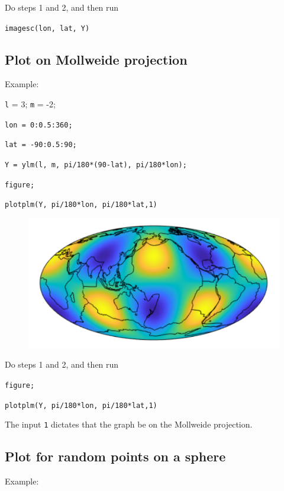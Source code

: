 \documentclass{article}
\begin{document}
\setlength{\parskip}{0.5cm plus4mm minus3mm}

Do steps 1 and 2, and then run

\verb+imagesc(lon, lat, Y)+

\subsection{Plot on Mollweide projection}

Example:
\vspace{2mm}

\setlength{\parskip}{.1mm}

\verb+l+ = 3; \verb+m+ = -2;

\verb+lon = 0:0.5:360;+

\verb+lat = -90:0.5:90;+

\verb+Y = ylm(l, m, pi/180*(90-lat), pi/180*lon);+

\verb+figure;+

\verb+plotplm(Y, pi/180*lon, pi/180*lat,1)+

\begin{figure}[H]
\includegraphics[scale=.8]{mollweide}
\end{figure}

\setlength{\parskip}{0.5cm plus4mm minus3mm}

Do steps 1 and 2, and then run

\verb+figure;+

\verb+plotplm(Y, pi/180*lon, pi/180*lat,1)+

The input \verb+1+ dictates that the graph be on the Mollweide projection.

\subsection{Plot for random points on a sphere}

Example:
\vspace{2mm}
\end{document}
